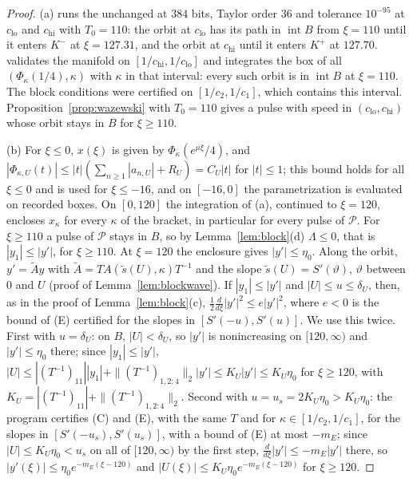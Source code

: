 \documentclass[11pt]{article}
\theoremstyle{definition}
\newcommand{\Pcl}{\mathcal{P}}
\begin{document}
\begin{proof}
(a)  runs the unchanged  at $384$ bits, Taylor order $36$ and tolerance $10^{-95}$ at $c_{\mathrm{lo}}$ and $c_{\mathrm{hi}}$ with $T_0 = 110$: the orbit at $c_{\mathrm{lo}}$ has its path in $\operatorname{int} B$ from $\xi = 110$ until it enters $K^-$ at $\xi = 127.31$, and the orbit at $c_{\mathrm{hi}}$ until it enters $K^+$ at $127.70$.  validates the manifold on $[1/c_{\mathrm{hi}}, 1/c_{\mathrm{lo}}]$ and integrates the box of all $(\Phi_\kappa(1/4), \kappa)$ with $\kappa$ in that interval: every such orbit is in $\operatorname{int} B$ at $\xi = 110$. The block conditions were certified on $[1/c_2, 1/c_1]$, which contains this interval. Proposition~\ref{prop:wazewski} with $T_0 = 110$ gives a pulse with speed in $(c_{\mathrm{lo}}, c_{\mathrm{hi}})$ whose orbit stays in $B$ for $\xi \ge 110$.

(b) For $\xi \le 0$, $x(\xi)$ is given by $\Phi_\kappa(e^{\mu\xi}/4)$, and $|\Phi_{\kappa, U}(t)| \le |t|(\sum_{n \ge 1}|a_{n, U}| + R_U) = C_U|t|$ for $|t| \le 1$; this bound holds for all $\xi \le 0$ and is used for $\xi \le -16$, and on $[-16, 0]$ the parametrization is evaluated on recorded boxes. On $[0, 120]$ the integration of (a), continued to $\xi = 120$, encloses $x_\kappa$ for every $\kappa$ of the bracket, in particular for every pulse of $\Pcl$. For $\xi \ge 110$ a pulse of $\Pcl$ stays in $B$, so by Lemma~\ref{lem:block}(d) $\Lambda \le 0$, that is $|y_1| \le |y'|$, for $\xi \ge 110$. At $\xi = 120$ the enclosure gives $|y'| \le \eta_0$. Along the orbit, $y' = \tilde A y$ with $\tilde A = TA(\tilde s(U), \kappa)T^{-1}$ and the slope $\tilde s(U) = S'(\vartheta)$, $\vartheta$ between $0$ and $U$ (proof of Lemma~\ref{lem:blockwave}). If $|y_1| \le |y'|$ and $|U| \le u \le \delta_U$, then, as in the proof of Lemma~\ref{lem:block}(c), $\frac12\frac{d}{d\xi}|y'|^2 \le e|y'|^2$, where $e < 0$ is the bound of (E) certified for the slopes in $[S'(-u), S'(u)]$. We use this twice. First with $u = \delta_U$: on $B$, $|U| < \delta_U$, so $|y'|$ is nonincreasing on $[120, \infty)$ and $|y'| \le \eta_0$ there; since $|y_1| \le |y'|$, $|U| \le |(T^{-1})_{11}||y_1| + \|(T^{-1})_{1, 2:4}\|_2|y'| \le K_U|y'| \le K_U\eta_0$ for $\xi \ge 120$, with $K_U = |(T^{-1})_{11}| + \|(T^{-1})_{1, 2:4}\|_2$. Second with $u = u_s = 2K_U\eta_0 > K_U\eta_0$: the program  certifies (C) and (E), with the same $T$ and for $\kappa \in [1/c_2, 1/c_1]$, for the slopes in $[S'(-u_s), S'(u_s)]$, with a bound of (E) at most $-m_E$; since $|U| \le K_U\eta_0 < u_s$ on all of $[120, \infty)$ by the first step, $\frac{d}{d\xi}|y'| \le -m_E|y'|$ there, so $|y'(\xi)| \le \eta_0e^{-m_E(\xi - 120)}$ and $|U(\xi)| \le K_U\eta_0e^{-m_E(\xi - 120)}$ for $\xi \ge 120$.
\end{proof}
\end{document}
